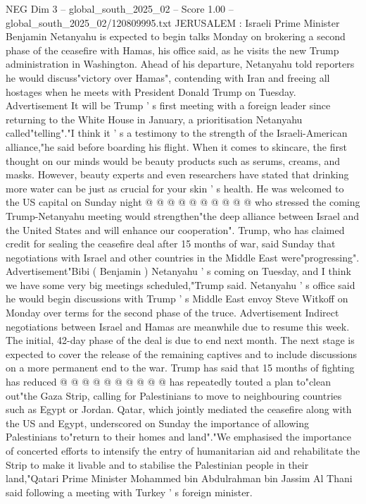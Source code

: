 \begin{textsample}{NEG Dim 3 – global\_south\_2025\_02 – Score 1.00 – global\_south\_2025\_02/120809995.txt}  \label{ex:f3_neg_048}
JERUSALEM : Israeli Prime Minister Benjamin Netanyahu is expected to begin talks Monday on brokering a second phase of the ceasefire with Hamas, his office said, as he visits the new Trump administration in Washington.
Ahead of his departure, Netanyahu told reporters he would discuss"victory over Hamas", contending with Iran and freeing all hostages when he meets with President Donald Trump on Tuesday.
Advertisement It will be Trump ' s first meeting with a foreign leader since returning to the White House in January, a prioritisation Netanyahu called"telling"."I think it ' s a testimony to the strength of the Israeli-American alliance,"he said before boarding his flight.
When it comes to skincare, the first thought on our minds would be beauty products such as serums, creams, and masks.
However, beauty experts and even researchers have stated that drinking more water can be just as crucial for your skin ' s health.
He was welcomed to the US capital on Sunday night @ @ @ @ @ @ @ @ @ @ who stressed the coming Trump-Netanyahu meeting would strengthen"the deep alliance between Israel and the United States and will enhance our cooperation".
Trump, who has claimed credit for sealing the ceasefire deal after 15 months of war, said Sunday that negotiations with Israel and other countries in the Middle East were"progressing".
Advertisement"Bibi ( Benjamin ) Netanyahu ' s coming on Tuesday, and I think we have some very big meetings scheduled,"Trump said.
Netanyahu ' s office said he would begin discussions with Trump ' s Middle East envoy Steve Witkoff on Monday over terms for the second phase of the truce.
Advertisement Indirect negotiations between Israel and Hamas are meanwhile due to resume this week.
The initial, 42-day phase of the deal is due to end next month.
The next stage is expected to cover the release of the remaining captives and to include discussions on a more permanent end to the war.
Trump has said that 15 months of fighting has reduced @ @ @ @ @ @ @ @ @ @ has repeatedly touted a plan to"clean out"the Gaza Strip, calling for Palestinians to move to neighbouring countries such as Egypt or Jordan.
Qatar, which jointly mediated the ceasefire along with the US and Egypt, underscored on Sunday the importance of allowing Palestinians to"return to their homes and land"."We emphasised the importance of concerted efforts to intensify the entry of humanitarian aid and rehabilitate the Strip to make it livable and to stabilise the Palestinian people in their land,"Qatari Prime Minister Mohammed bin Abdulrahman bin Jassim Al Thani said following a meeting with Turkey ' s foreign minister.

\end{textsample}
